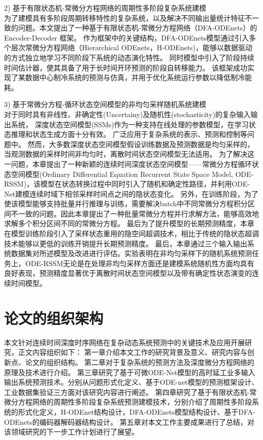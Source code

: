 2) 基于有限状态机-常微分方程网络的周期性多阶段复杂系统建模 \\
为了建模具有多阶段周期转移特性的复杂系统，以及解决不同输出量统计特征不一致的问题。本文提出了一种基于有限状态机-常微分方程网络（DFA-ODEnets）的Encoder-Decoder 框架。
作为框架中的关键结构，DFA-ODEnets模型通过引入多个层次常微分方程网络（Hierarchical ODEnets，H-ODEnets)，能够以数据驱动的方式独立地学习不同阶段下系统的动态演化特性。
同时模型中引入了阶段持续时间估计器，使其具备了用于长时间开环预测的阶段自转移能力。
该框架成功实现了某数据中心制冷系统的预测与仿真，并用于优化系统运行参数以降低制冷能耗。

3) 基于常微分方程-循环状态空间模型的非均匀采样随机系统建模 \\
对于同时具有非线性、非确定性(Uncertainy)及随机性(stochasticity)的复杂输入输出系统，
深度状态空间模型(SSMs)作为一种支持在线处理的参数模型，在学习状态推理和状态生成方面十分有效。
广泛应用于复杂系统的表示、预测和控制等问题中。
然而，大多数深度状态空间模型假设训练数据及预测数据是均匀采样的，当观测数据的采样时间非均匀时，离散时间状态空间模型无法适用。
为了解决这一问题，本章提出了一种新颖的连续时间深度状态空间模型——常微分方程循环状态空间模型(Ordinary Differential Equation Recurrent State Space Model, ODE-RSSM)，该模型在状态转换过程中同时引入了随机和确定性路径，并利用ODE-Net建模连续时域下相邻采样时间点之间的隐状态变化。
另外，在训练阶段，为了使该模型能够支持批量并行推理与训练，需要解决batch中不同常微分方程积分区间不一致的问题。因此本章提出了一种批量常微分方程并行求解方法，能够高效地求解多个积分区间不同的常微分方程。
最后为了提升模型的长期预测精度，本章在模型训练阶段引入了采样状态重用的隐空间超调技术，相比于传统的隐状态超调技术能够以更低的训练开销提升长期预测精度。
最后，本章通过三个输入输出系统数据集对所述模型及改进进行评估。实验表明在非均匀采样下的随机系统预测任务上，ODE-RSSM无论是在处理非均匀采样方面还是建模系统随机性方面均具有良好表现，预测精度显著优于离散时间状态空间模型以及带有确定性状态演变的连续时间模型。
\section{论文的组织架构}

本文针对连续时间深度时序网络在复杂动态系统预测中的关键技术及应用开展研究，正文内容组织如下：
第一章介绍本文工作的研究背景及意义、研究内容与创新点、论文的组织结构。
第二章对于复杂系统的预测方法及深度微分方程网络的原理及技术进行介绍。
第三章研究了基于可微ODE-Net模型的高时延工业多输入输出系统预测技术。分别从问题形式化定义、基于ODE-net模型的预测框架设计、工业数据集验证三方面对该研究内容进行阐述。
第四章研究了基于有限状态机-常微分方程网络的周期性多阶段复杂系统预测建模技术，分别介绍了周期性多阶段系统的形式化定义，H-ODEnet结构设计，DFA-ODEnets模型结构设计、基于DFA-ODEnets的编码器解码器结构设计。
第五章对本文工作主要成果进行了总结，对该领域研究的下一步工作计划进行了展望。
